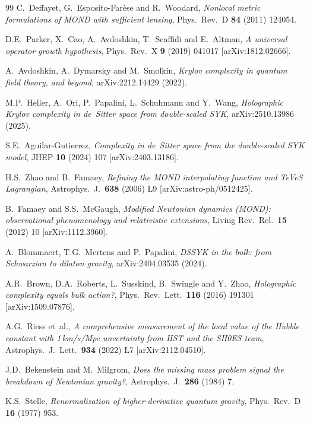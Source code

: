 \documentclass[a4paper,11pt]{article}
\begin{document}
\begin{thebibliography}{99}
  C.~Deffayet, G.~Esposito-Far{\`e}se and R.~Woodard,
  \emph{Nonlocal metric formulations of MOND with sufficient lensing},
  Phys.\ Rev.\ D \textbf{84} (2011) 124054.

  D.E.~Parker, X.~Cao, A.~Avdoshkin, T.~Scaffidi and E.~Altman,
  \emph{A universal operator growth hypothesis},
  Phys.\ Rev.\ X \textbf{9} (2019) 041017 [arXiv:1812.02666].

  A.~Avdoshkin, A.~Dymarsky and M.~Smolkin,
  \emph{Krylov complexity in quantum field theory, and beyond},
  arXiv:2212.14429 (2022).

  M.P.~Heller, A.~Ori, P.~Papalini, L.~Schuhmann and Y.~Wang,
  \emph{Holographic Krylov complexity in de~Sitter space from
  double-scaled SYK},
  arXiv:2510.13986 (2025).

  S.E.~Aguilar-Gutierrez,
  \emph{Complexity in de~Sitter space from the double-scaled SYK model},
  JHEP \textbf{10} (2024) 107 [arXiv:2403.13186].

  H.S.~Zhao and B.~Famaey,
  \emph{Refining the MOND interpolating function and TeVeS Lagrangian},
  Astrophys.\ J.\ \textbf{638} (2006) L9 [arXiv:astro-ph/0512425].

  B.~Famaey and S.S.~McGaugh,
  \emph{Modified Newtonian dynamics (MOND): observational phenomenology
  and relativistic extensions},
  Living Rev.\ Rel.\ \textbf{15} (2012) 10 [arXiv:1112.3960].

  A.~Blommaert, T.G.~Mertens and P.~Papalini,
  \emph{DSSYK in the bulk: from Schwarzian to dilaton gravity},
  arXiv:2404.03535 (2024).

  A.R.~Brown, D.A.~Roberts, L.~Susskind, B.~Swingle and Y.~Zhao,
  \emph{Holographic complexity equals bulk action?},
  Phys.\ Rev.\ Lett.\ \textbf{116} (2016) 191301 [arXiv:1509.07876].

  A.G.~Riess et~al.,
  \emph{A comprehensive measurement of the local value of the Hubble
  constant with 1\,km/s/Mpc uncertainty from HST and the SH0ES team},
  Astrophys.\ J.\ Lett.\ \textbf{934} (2022) L7 [arXiv:2112.04510].

  J.D.~Bekenstein and M.~Milgrom,
  \emph{Does the missing mass problem signal the breakdown of Newtonian
  gravity?},
  Astrophys.\ J.\ \textbf{286} (1984) 7.

  K.S.~Stelle,
  \emph{Renormalization of higher-derivative quantum gravity},
  Phys.\ Rev.\ D \textbf{16} (1977) 953.


\end{thebibliography}
\end{document}
